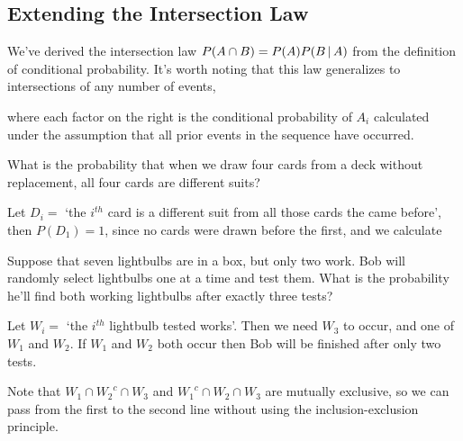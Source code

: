 \subsection*{Extending the Intersection Law}

We've derived the intersection law $P(A \cap B) = P(A) P(B \,|\, A)$ from the definition of conditional probability. It's worth noting that this law generalizes to intersections of any number of events,
\par
\noindent where each factor on the right is the conditional probability of $A_i$ calculated under the assumption that all prior events in the sequence have occurred.
\begin{examp}
What is the probability that when we draw four cards from a deck without replacement, all four cards are different suits?
\par
\noindent Let $D_i =$ `the $i^{th}$ card is a different suit from all those cards the came before', then $P(D_1) = 1$, since no cards were drawn before the first, and we calculate

\end{examp}
\begin{examp}
Suppose that seven lightbulbs are in a box, but only two work. Bob will randomly select lightbulbs one at a time and test them. What is the probability he'll find both working lightbulbs after exactly three tests?
\par
\noindent Let $W_i =$ `the $i^{th}$ lightbulb tested works'. Then we need $W_3$ to occur, and one of $W_1$ and $W_2$. If $W_1$ and $W_2$ both occur then Bob will be finished after only two tests.
\par
\noindent Note that $W_1 \cap {W_2}^c \cap W_3$ and ${W_1}^c \cap W_2 \cap W_3$ are mutually exclusive, so we can pass from the first to the second line without using the inclusion-exclusion principle.
\end{examp}

